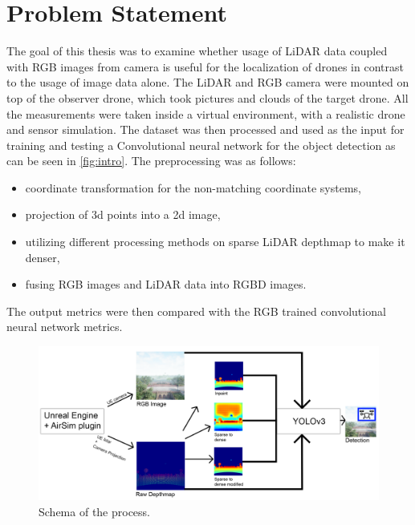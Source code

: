 \documentclass[twoside]{ctuthesis}
\theoremstyle{plain}
\theoremstyle{definition}
\theoremstyle{note}
\begin{document}
\section{Problem Statement}
The goal of this thesis was to examine whether usage of LiDAR data coupled with RGB images from camera is useful for the localization of drones in contrast to the usage of image data alone. The LiDAR and RGB camera were mounted on top of the observer drone, which took pictures and clouds of the target drone. All the measurements were taken inside a virtual environment, with a realistic drone and sensor simulation. The dataset was then processed and used as the input for training and testing a Convolutional neural network for the object detection as can be seen in \autoref{fig:intro}. The preprocessing was as follows:
\begin{itemize}
	\item coordinate transformation for the non-matching coordinate systems,
	\item projection of 3d points into a 2d image,
	\item utilizing different processing methods on sparse LiDAR depthmap to make it denser,
	\item fusing RGB images and LiDAR data into RGBD images.
\end{itemize}
The output metrics were then compared with the RGB trained convolutional neural network metrics.
\begin{figure}
	\centering
	\includegraphics[width=\textwidth]{detection_schema.png}
	\caption{Schema of the process.}
	\label{fig:intro}
\end{figure}
\end{document}
